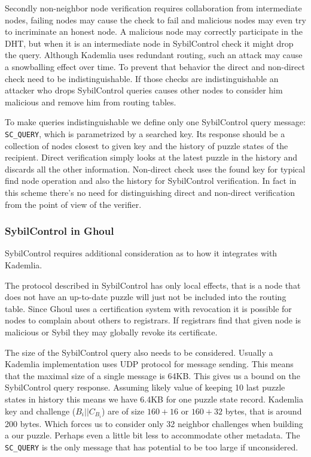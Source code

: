   Secondly non-neighbor node verification requires collaboration from
  intermediate nodes, failing nodes may cause the check to fail and malicious
  nodes may even try to incriminate an honest node. A malicious node may
  correctly participate in the DHT, but when it is an intermediate node in
  SybilControl check it might drop the query. Although Kademlia uses redundant
  routing, such an attack may cause a snowballing effect over time. To prevent
  that behavior the direct and non-direct check need to be indistinguishable.
  If those checks are indistinguishable an attacker who drops SybilControl
  queries causes other nodes to consider him malicious and remove him from
  routing tables.

  To make queries indistinguishable we define only one SybilControl query
  message: \texttt{SC\_QUERY}, which is parametrized by a searched key. Its
  response should be a collection of nodes closest to given key and the history
  of puzzle states of the recipient. Direct verification simply looks at the
  latest puzzle in the history and discards all the other information.
  Non-direct check uses the found key for typical find node operation and also
  the history for SybilControl verification. In fact in this scheme there's no
  need for distinguishing direct and non-direct verification from the point of
  view of the verifier.

\subsubsection{SybilControl in Ghoul}
  SybilControl requires additional consideration as to how it integrates with
  Kademlia.

  The protocol described in SybilControl has only local effects, that is a node
  that does not have an up-to-date puzzle will just not be included into the
  routing table. Since Ghoul uses a certification system with revocation it is
  possible for nodes to complain about others to registrars. If registrars find
  that given node is malicious or Sybil they may globally revoke its
  certificate.

  The size of the SybilControl query also needs to be considered. Usually a
  Kademlia implementation uses UDP protocol for message sending. This means that
  the maximal size of a single message is 64KB. This gives us a bound on the
  SybilControl query response. Assuming likely value of keeping 10 last puzzle
  states in history this means we have 6.4KB for one puzzle state record.
  Kademlia key and challenge ($B_i || C_{B_i}$) are of size $160 + 16$ or $160
  + 32$ bytes, that is around 200 bytes. Which forces us to consider only 32
  neighbor challenges when building a our puzzle. Perhaps even a little bit
  less to accommodate other metadata. The \texttt{SC\_QUERY} is the only message
  that has potential to be too large if unconsidered.

